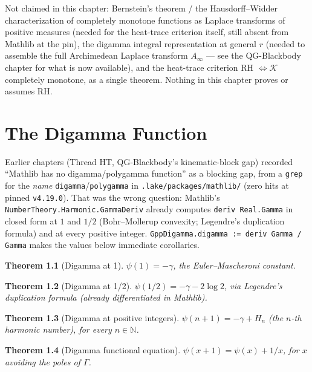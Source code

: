 \documentclass{report}
\newtheorem{theorem}{Theorem}[chapter]
\theoremstyle{definition}
\begin{document}
Not claimed in this chapter: Bernstein's theorem / the Hausdorff--Widder characterization of
completely monotone functions as Laplace transforms of positive measures (needed for the
heat-trace criterion itself, still absent from Mathlib at the pin), the digamma integral
representation at general $r$ (needed to assemble the full Archimedean Laplace transform
$A_\infty$ --- see the QG-Blackbody chapter for what is now available), and the heat-trace
criterion RH $\iff \mathcal{K}$ completely monotone, as a single theorem. Nothing in this
chapter proves or assumes RH.

\chapter{The Digamma Function}

Earlier chapters (Thread HT, QG-Blackbody's kinematic-block gap) recorded ``Mathlib has no
digamma/polygamma function'' as a blocking gap, from a \texttt{grep} for the \emph{name}
\texttt{digamma}/\texttt{polygamma} in \texttt{.lake/packages/mathlib/} (zero hits at pinned
\texttt{v4.19.0}). That was the wrong question: Mathlib's
\texttt{NumberTheory.Harmonic.GammaDeriv} already computes \texttt{deriv Real.Gamma} in
closed form at $1$ and $1/2$ (Bohr--Mollerup convexity; Legendre's duplication formula) and
at every positive integer. \texttt{GppDigamma.digamma := deriv Gamma / Gamma} makes the
values below immediate corollaries.

\begin{theorem}[Digamma at 1]
  \label{thm:digamma-one}
  \leanok
  $\psi(1) = -\gamma$, the Euler--Mascheroni constant.
\end{theorem}

\begin{theorem}[Digamma at 1/2]
  \label{thm:digamma-one-half}
  \leanok
  $\psi(1/2) = -\gamma - 2\log 2$, via Legendre's duplication formula (already differentiated
  in Mathlib).
\end{theorem}

\begin{theorem}[Digamma at positive integers]
  \label{thm:digamma-nat}
  \leanok
  $\psi(n+1) = -\gamma + H_n$ (the $n$-th harmonic number), for every $n\in\mathbb{N}$.
\end{theorem}

\begin{theorem}[Digamma functional equation]
  \label{thm:digamma-add-one}
  \leanok
  $\psi(x+1) = \psi(x) + 1/x$, for $x$ avoiding the poles of $\Gamma$.
\end{theorem}
\end{document}
